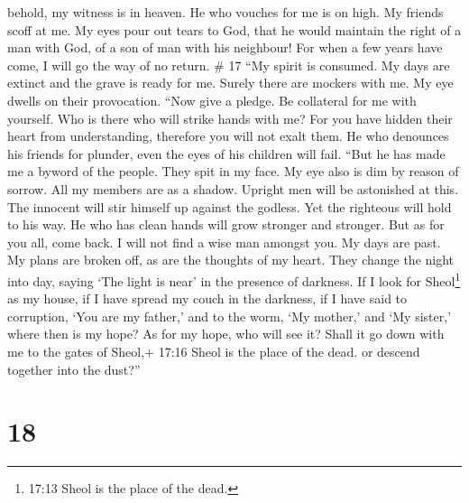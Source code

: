 behold, my witness is in heaven. He who vouches for me is on high.
 My friends scoff at me. My eyes pour out tears to God,
 that he would maintain the right of a man with God, of a
son of man with his neighbour!  For when a few years have
come, I will go the way of no return. \# 17  ``My spirit is
consumed. My days are extinct and the grave is ready for me.
 Surely there are mockers with me. My eye dwells on their
provocation.  ``Now give a pledge. Be collateral for me with
yourself. Who is there who will strike hands with me?  For
you have hidden their heart from understanding, therefore you will not
exalt them.  He who denounces his friends for plunder, even
the eyes of his children will fail.  ``But he has made me a
byword of the people. They spit in my face.  My eye also is
dim by reason of sorrow. All my members are as a shadow. 
Upright men will be astonished at this. The innocent will stir himself
up against the godless.  Yet the righteous will hold to his
way. He who has clean hands will grow stronger and stronger.
 But as for you all, come back. I will not find a wise man
amongst you.  My days are past. My plans are broken off, as
are the thoughts of my heart.  They change the night into
day, saying `The light is near' in the presence of darkness.
 If I look for Sheol\footnote{17:13 Sheol is the place of
  the dead.} as my house, if I have spread my couch in the darkness,
 if I have said to corruption, `You are my father,' and to
the worm, `My mother,' and `My sister,'  where then is my
hope? As for my hope, who will see it?  Shall it go down
with me to the gates of Sheol,+ 17:16 Sheol is the place of the dead. or
descend together into the dust?''

\hypertarget{section-12}{%
\section{18}\label{section-12}}

